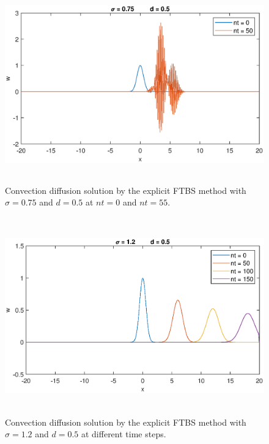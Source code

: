 \documentclass[letterpaper,12pt]{article}
\begin{document}
\begin{figure}[H] 
	\centering 
	\includegraphics[max height=8.5cm]{graphs/FTBS/ConvectionDiffusion/sigma075d05.eps}
	\caption{Convection diffusion solution by the explicit FTBS method with $\sigma= 0.75$ and $d=0.5$ at $nt=0$ and $nt=55$.}
	 \label{fig:FTBSsigma075d05}
\end{figure}
\vspace{1cm}
\begin{figure}[H] 
	\centering 
	\includegraphics[max height=8.5cm]{graphs/FTBS/ConvectionDiffusion/sigma12d05.eps}
	\caption{Convection diffusion solution by the explicit FTBS method with $\sigma= 1.2$ and $d=0.5$ at different time steps.}
	 \label{fig:FTBSsigma12d05}
\end{figure}
\end{document}

